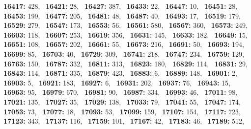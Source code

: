 \textbf{16417:} 428,\allowbreak~ 
\textbf{16421:} 28,\allowbreak~ 
\textbf{16427:} 387,\allowbreak~ 
\textbf{16433:} 22,\allowbreak~ 
\textbf{16447:} 10,\allowbreak~ 
\textbf{16451:} 28,\allowbreak~ 
\textbf{16453:} 199,\allowbreak~ 
\textbf{16477:} 205,\allowbreak~ 
\textbf{16481:} 48,\allowbreak~ 
\textbf{16487:} 40,\allowbreak~ 
\textbf{16493:} 17,\allowbreak~ 
\textbf{16519:} 179,\allowbreak~ 
\textbf{16529:} 279,\allowbreak~ 
\textbf{16547:} 173,\allowbreak~ 
\textbf{16553:} 56,\allowbreak~ 
\textbf{16561:} 580,\allowbreak~ 
\textbf{16567:} 360,\allowbreak~ 
\textbf{16573:} 249,\allowbreak~ 
\textbf{16603:} 118,\allowbreak~ 
\textbf{16607:} 253,\allowbreak~ 
\textbf{16619:} 356,\allowbreak~ 
\textbf{16631:} 145,\allowbreak~ 
\textbf{16633:} 182,\allowbreak~ 
\textbf{16649:} 15,\allowbreak~ 
\textbf{16651:} 108,\allowbreak~ 
\textbf{16657:} 202,\allowbreak~ 
\textbf{16661:} 55,\allowbreak~ 
\textbf{16673:} 216,\allowbreak~ 
\textbf{16691:} 50,\allowbreak~ 
\textbf{16693:} 194,\allowbreak~ 
\textbf{16699:} 85,\allowbreak~ 
\textbf{16703:} 40,\allowbreak~ 
\textbf{16729:} 309,\allowbreak~ 
\textbf{16741:} 218,\allowbreak~ 
\textbf{16747:} 234,\allowbreak~ 
\textbf{16759:} 129,\allowbreak~ 
\textbf{16763:} 150,\allowbreak~ 
\textbf{16787:} 332,\allowbreak~ 
\textbf{16811:} 313,\allowbreak~ 
\textbf{16823:} 180,\allowbreak~ 
\textbf{16829:} 114,\allowbreak~ 
\textbf{16831:} 29,\allowbreak~ 
\textbf{16843:} 114,\allowbreak~ 
\textbf{16871:} 335,\allowbreak~ 
\textbf{16879:} 423,\allowbreak~ 
\textbf{16883:} 6,\allowbreak~ 
\textbf{16889:} 148,\allowbreak~ 
\textbf{16901:} 2,\allowbreak~ 
\textbf{16903:} 5,\allowbreak~ 
\textbf{16921:} 183,\allowbreak~ 
\textbf{16927:} 6,\allowbreak~ 
\textbf{16931:} 202,\allowbreak~ 
\textbf{16937:} 76,\allowbreak~ 
\textbf{16943:} 15,\allowbreak~ 
\textbf{16963:} 95,\allowbreak~ 
\textbf{16979:} 670,\allowbreak~ 
\textbf{16981:} 90,\allowbreak~ 
\textbf{16987:} 334,\allowbreak~ 
\textbf{16993:} 46,\allowbreak~ 
\textbf{17011:} 98,\allowbreak~ 
\textbf{17021:} 135,\allowbreak~ 
\textbf{17027:} 35,\allowbreak~ 
\textbf{17029:} 138,\allowbreak~ 
\textbf{17033:} 79,\allowbreak~ 
\textbf{17041:} 55,\allowbreak~ 
\textbf{17047:} 174,\allowbreak~ 
\textbf{17053:} 73,\allowbreak~ 
\textbf{17077:} 18,\allowbreak~ 
\textbf{17093:} 53,\allowbreak~ 
\textbf{17099:} 159,\allowbreak~ 
\textbf{17107:} 154,\allowbreak~ 
\textbf{17117:} 723,\allowbreak~ 
\textbf{17123:} 343,\allowbreak~ 
\textbf{17137:} 116,\allowbreak~ 
\textbf{17159:} 101,\allowbreak~ 
\textbf{17167:} 42,\allowbreak~ 
\textbf{17183:} 46,\allowbreak~ 
\textbf{17189:} 512,\allowbreak~ 
